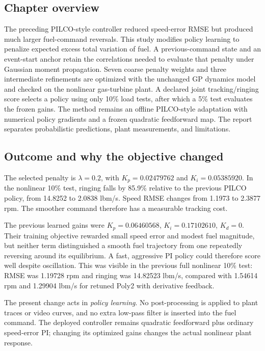 \subsection*{Chapter overview}
The preceding PILCO-style controller reduced speed-error RMSE but produced much larger fuel-command reversals. This study modifies policy learning to penalize expected excess total variation of fuel. A previous-command state and an event-start anchor retain the correlations needed to evaluate that penalty under Gaussian moment propagation. Seven coarse penalty weights and three intermediate refinements are optimized with the unchanged GP dynamics model and checked on the nonlinear gas-turbine plant. A declared joint tracking/ringing score selects a policy using only 10\% load tests, after which a 5\% test evaluates the frozen gains. The method remains an offline PILCO-style adaptation with numerical policy gradients and a frozen quadratic feedforward map. The report separates probabilistic predictions, plant measurements, and limitations.

\subsection{Outcome and why the objective changed}
The selected penalty is $\lambda=0.2$, with $K_p=0.02479762$ and $K_i=0.05385920$. In the nonlinear 10\% test, ringing falls by 85.9\% relative to the previous PILCO policy, from 14.8252 to 2.0838 lbm/s. Speed RMSE changes from 1.1973 to 2.3877 rpm. The smoother command therefore has a measurable tracking cost.

The previous learned gains were $K_p=0.06460568$, $K_i=0.17102610$, $K_d=0$. Their training objective rewarded small speed error and modest fuel magnitude, but neither term distinguished a smooth fuel trajectory from one repeatedly reversing around its equilibrium. A fast, aggressive PI policy could therefore score well despite oscillation. This was visible in the previous full nonlinear 10\% test: RMSE was 1.19728 rpm and ringing was 14.82523 lbm/s, compared with 1.54614 rpm and 1.29904 lbm/s for retuned Poly2 with derivative feedback.

The present change acts in \emph{policy learning}. No post-processing is applied to plant traces or video curves, and no extra low-pass filter is inserted into the fuel command. The deployed controller remains quadratic feedforward plus ordinary speed-error PI; changing its optimized gains changes the actual nonlinear plant response.

